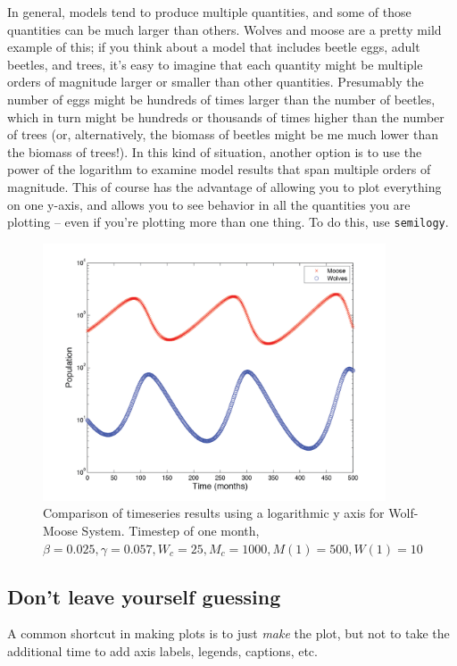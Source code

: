 \documentclass{tufte-handout}
\begin{document}
In general, models tend to produce multiple quantities, and some of those quantities can be much larger than others.  Wolves and moose are a pretty mild example of this; if you think about a model that includes beetle eggs, adult beetles, and trees, it's easy to imagine that each quantity might be multiple orders of magnitude larger or smaller than other quantities. Presumably the number of eggs might be  hundreds of times larger than the number of beetles, which in turn might be hundreds or thousands  of times higher than the number of trees (or, alternatively, the biomass of beetles might be me much lower than the biomass of trees!).  In this kind of situation, another option is to use the power of the logarithm to examine model results that span multiple orders of magnitude.  This of course has the advantage of allowing you to plot everything on one y-axis, and allows you to see behavior in all the quantities you are plotting -- even if you're plotting more than one thing.  To do this, use {\tt semilogy}.

\begin{figure}[h!]
\includegraphics[width=4in]{figs/LogarithmicWolfMooseTImeSeries}
\caption{Comparison of timeseries results using a logarithmic y axis for Wolf-Moose System. Timestep of one month,   $\beta = 0.025, \gamma = 0.057, W_c = 25, M_c=1000, M(1) = 500, W(1) = 10$}
\end{figure}

\subsection{Don't leave yourself guessing}

A common shortcut in making plots is to just {\it make} the plot, but not to take the additional time to add axis labels, legends, captions, etc.  
\end{document}
